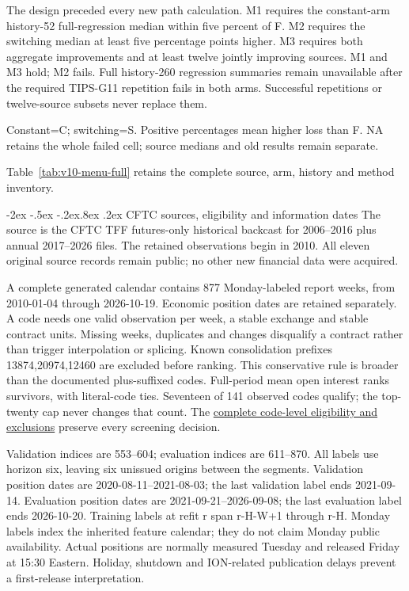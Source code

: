 \documentclass[10pt,a4paper]{article}
\makeatletter
\renewcommand\section{\@startsection{section}{1}{\z@}%
  {-2ex \@plus -.5ex \@minus -.2ex}{.8ex \@plus .2ex}%
  {\normalfont\large\bfseries}}
\makeatother
\begin{document}
The design preceded every new path calculation. M1 requires the constant-arm history-52 full-regression median within five percent of F. M2 requires the switching median at least five percentage points higher. M3 requires both aggregate improvements and at least twelve jointly improving sources. M1 and M3 hold; M2 fails. Full history-260 regression summaries remain unavailable after the required TIPS-G11 repetition fails in both arms. Successful repetitions or twelve-source subsets never replace them.

\par\smallskip\noindent\begin{minipage}{\linewidth}\footnotesize Constant=C; switching=S. Positive percentages mean higher loss than F. NA retains the whole failed cell; source medians and old results remain separate.\end{minipage}
Table~\ref{tab:v10-menu-full} retains the complete source, arm, history and method inventory.


\clearpage
\section{CFTC sources, eligibility and information dates}\label{sup:v10-cftc}
The source is the CFTC TFF futures-only historical backcast for 2006--2016 plus annual 2017--2026 files. The retained observations begin in 2010. All eleven original source records remain public; no other new financial data were acquired.

A complete generated calendar contains 877 Monday-labeled report weeks, from 2010-01-04 through 2026-10-19. Economic position dates are retained separately. A code needs one valid observation per week, a stable exchange and stable contract units. Missing weeks, duplicates and changes disqualify a contract rather than trigger interpolation or splicing. Known consolidation prefixes 13874,20974,12460 are excluded before ranking. This conservative rule is broader than the documented plus-suffixed codes. Full-period mean open interest ranks survivors, with literal-code ties. Seventeen of 141 observed codes qualify; the top-twenty cap never changes that count.
The \href{https://github.com/ByronLi0207/financial-mathematics-paper-20261020/blob/revision-v10b/results/v10/cftc/eligibility.json}{complete code-level eligibility and exclusions} preserve every screening decision.

Validation indices are 553--604; evaluation indices are 611--870. All labels use horizon six, leaving six unissued origins between the segments. Validation position dates are 2020-08-11--2021-08-03; the last validation label ends 2021-09-14. Evaluation position dates are 2021-09-21--2026-09-08; the last evaluation label ends 2026-10-20. Training labels at refit r span r-H-W+1 through r-H. Monday labels index the inherited feature calendar; they do not claim Monday public availability. Actual positions are normally measured Tuesday and released Friday at 15:30 Eastern. Holiday, shutdown and ION-related publication delays prevent a first-release interpretation.
\end{document}
